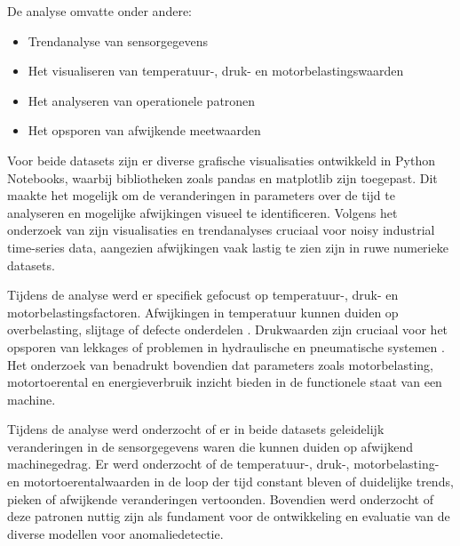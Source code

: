 De analyse omvatte onder andere:

\begin{itemize}
    \item Trendanalyse van sensorgegevens
    
    \item Het visualiseren van temperatuur-, druk- en motorbelastingswaarden
    
    \item Het analyseren van operationele patronen
    
    \item Het opsporen van afwijkende meetwaarden
\end{itemize}

Voor beide datasets zijn er diverse grafische visualisaties ontwikkeld in Python Notebooks, waarbij bibliotheken zoals pandas en matplotlib zijn toegepast. Dit maakte het mogelijk om de veranderingen in parameters over de tijd te analyseren en mogelijke afwijkingen visueel te identificeren. Volgens het onderzoek van \textcite{Dissem2024} zijn visualisaties en trendanalyses cruciaal voor noisy industrial time-series data, aangezien afwijkingen vaak lastig te zien zijn in ruwe numerieke datasets.

Tijdens de analyse werd er specifiek gefocust op temperatuur-, druk- en motorbelastingsfactoren. Afwijkingen in temperatuur kunnen duiden op overbelasting, slijtage of defecte onderdelen \autocite{Touil2025}. Drukwaarden zijn cruciaal voor het opsporen van lekkages of problemen in hydraulische en pneumatische systemen \autocite{Daoudi2025}. Het onderzoek van \textcite{Mahale2025} benadrukt bovendien dat parameters zoals motorbelasting, motortoerental en energieverbruik inzicht bieden in de functionele staat van een machine.

Tijdens de analyse werd onderzocht of er in beide datasets geleidelijk veranderingen in de sensorgegevens waren die kunnen duiden op afwijkend machinegedrag. Er werd onderzocht of de temperatuur-, druk-, motorbelasting- en motortoerentalwaarden in de loop der tijd constant bleven of duidelijke trends, pieken of afwijkende veranderingen vertoonden. Bovendien werd onderzocht of deze patronen nuttig zijn als fundament voor de ontwikkeling en evaluatie van de diverse modellen voor anomaliedetectie.



